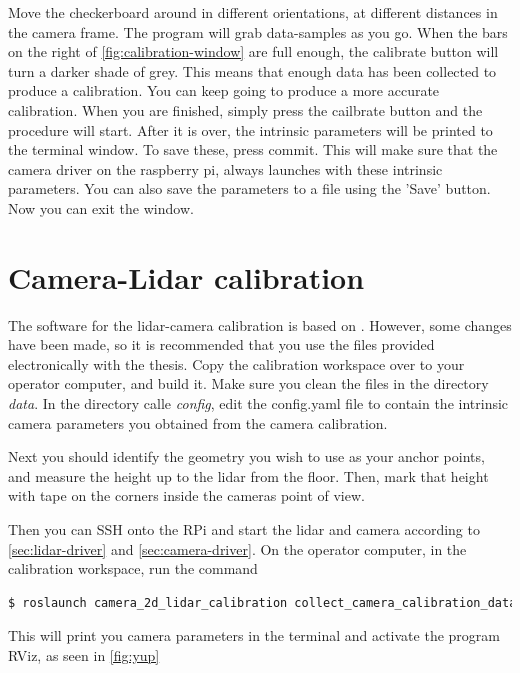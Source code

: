 Move the checkerboard around in different orientations, at different distances in the camera frame. The program will grab data-samples as you go. When the bars on the right of \cref{fig:calibration-window} are full enough, the calibrate button will turn a darker shade of grey. This means that enough data has been collected to produce a calibration. You can keep going to produce a more accurate calibration. When you are finished, simply press the cailbrate button and the procedure will start. After it is over, the intrinsic parameters will be printed to the terminal window. To save these, press commit. This will make sure that the camera driver on the raspberry pi, always launches with these intrinsic parameters. You can also save the parameters to a file using the 'Save' button. Now you can exit the window. 

\section{Camera-Lidar calibration}

The software for the lidar-camera calibration is based on \cite{calibration-repo}. However, some changes have been made, so it is recommended that you use the files provided electronically with the thesis. Copy the calibration workspace over to your operator computer, and build it. Make sure you clean the files in the directory \textit{data}. In the directory calle \textit{config}, edit the config.yaml file to contain the intrinsic camera  parameters you obtained from the camera calibration.

Next you should identify the geometry you wish to use as your anchor points, and measure the height up to the lidar from the floor. Then, mark that height with tape on the corners inside the cameras point of view. 

Then you can SSH onto the RPi and start the lidar and camera according to \cref{sec:lidar-driver} and \cref{sec:camera-driver}. On the operator computer, in the calibration workspace, run the command 

\begin{lstlisting}[language=bash]
$ roslaunch camera_2d_lidar_calibration collect_camera_calibration_data.launch
\end{lstlisting}

This will print you camera parameters in the terminal and activate the program RViz, as seen in \cref{fig:yup}

